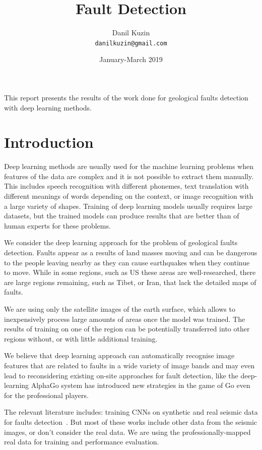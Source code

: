 \documentclass[11pt,a4paper]{article}
\begin{document}
\title{Fault Detection}
\author{Danil Kuzin \\ \texttt{danilkuzin@gmail.com}}
\date{January-March 2019}
\maketitle

\abstract
This report presents the results of the work done for geological faults detection with deep learning methods.



\section{Introduction}
Deep learning methods are usually used for the machine learning problems when features of the data are complex and it
is not possible to extract them manually. This includes speech recognition with different phonemes, text translation
with different meanings of words depending on the context, or image recognition with a large variety of shapes. Training
of deep learning models usually requires large datasets, but the trained models can produce results that are better than
of human experts for these problems.

We consider the deep learning approach for the problem of geological faults detection. Faults appear as a results of
land masses moving and can be dangerous to the people leaving nearby as they can cause earthquakes when they continue to
move. While in some regions, such as US these areas are well-researched, there are large regions remaining, such as Tibet,
or Iran, that lack the detailed maps of faults.

We are using only the satellite images of the earth surface, which allows to inexpensively process large amounts of areas
once the model was trained. The results of training on one of the region can be potentially transferred into other regions
without, or with little additional training.

We believe that deep learning approach can automatically recognise image features that are related to faults in a wide
variety of image bands and may even lead to reconsidering existing on-site approaches for fault detection, like the
deep-learning AlphaGo system has introduced new strategies in the game of Go even for the professional players.

The relevant literature includes: training CNNs on synthetic and real seismic data for faults
detection~\cite{pochet2018seismic, araya2017automated, xiong2018seismic, chehrazi2013seismic, lu2018using, hale2014}.
But most of these works include other data from the seismic images, or don't consider the real data. We are using the
professionally-mapped real data for training and performance evaluation.
\end{document}
